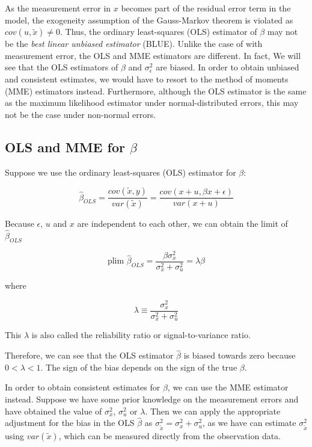 \documentclass{article}
\begin{document}
As the measurement error in $x$ becomes part of the residual error term in the model, the exogeneity assumption of the Gauss-Markov theorem is violated as $cov(u, \tilde{x}) \neq 0$.
Thus, the ordinary least-squares (OLS) estimator of $\beta$ may not be the \textit{best linear unbiased estimator} (BLUE).
Unlike the case of with measurement error, the OLS and MME estimators are different.
In fact, We will see that the OLS estimators of $\beta$ and $\sigma_\epsilon^2$ are biased. 
In order to obtain unbiased and consistent estimates, we would have to resort to the method of moments (MME) estimators instead. 
Furthermore, although the OLS estimator is the same as the maximum likelihood estimator under normal-distributed errors, this may not be the case under non-normal errors. 

\subsection{OLS and MME for $\beta$}

Suppose we use the ordinary least-squares (OLS) estimator for $\beta$:

\begin{equation}
    \hat{\beta}_{OLS} = \frac{cov(\tilde{x}, y)}{var(\tilde{x})} = \frac{cov(x+u, \beta x + \epsilon)}{var(x + u)}
\end{equation}

Because $\epsilon$, $u$ and $x$ are independent to each other, we can obtain the limit of $\hat{\beta}_{OLS}$

\begin{equation}
    \textrm{plim } \hat{\beta}_{OLS} = \frac{\beta \sigma^2_x}{\sigma^2_x + \sigma^2_u} = \lambda \beta
\end{equation}

where

\begin{equation}
    \lambda \equiv \frac{\sigma_x^2}{\sigma_x^2 + \sigma_u^2}
\end{equation}

This $\lambda$ is also called the reliability ratio or signal-to-variance ratio.

Therefore, we can see that the OLS estimator $\hat{\beta}$ is biased towards zero because $0 < \lambda < 1$. The sign of the bias depends on the sign of the true $\beta$.

In order to obtain consistent estimates for $\beta$, we can use the MME estimator instead.
Suppose we have some prior knowledge on the measurement errors and have obtained the value of $\sigma_x^2$, $\sigma_u^2$ or $\lambda$.
Then we can apply the appropriate adjustment for the bias in the OLS $\hat{\beta}$ as $\sigma^2_{\tilde{x}} = \sigma^2_x + \sigma^2_u$, as we have can estimate $\sigma^2_{\tilde{x}}$ using $var(\tilde{x})$, which can be measured directly from the observation data. 
\end{document}
